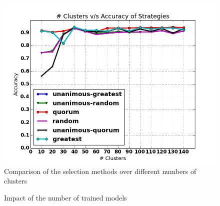 \documentclass[conference]{IEEEtran}
\begin{document}
\begin{figure}[!t]
	\centering
	\includegraphics[width=1\columnwidth]{hypothesis_updated}
	\caption{Comparison of the selection methods over different numbers of clusters}
	\label{fig:hypo_updated}
\end{figure}

\begin{figure}[t]
 \centering
 \hspace{.3in}
 \caption{Impact of the number of trained models
 }
 \label{fig:nmodels_quorum}
\end{figure}
\end{document}
